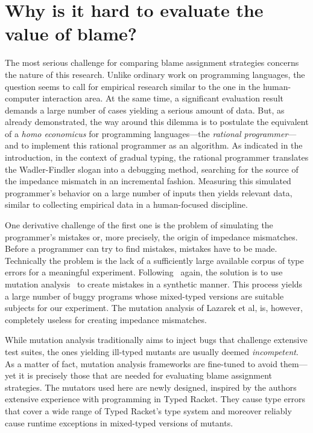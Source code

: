 
\section{Why is it hard to evaluate the value of blame?}
\label{sec:challenges}

The most serious challenge for comparing blame assignment strategies concerns 
the nature of this research. Unlike ordinary
work on programming languages, the question seems to call for empirical research
similar to the one in the human-computer interaction area. At the same time, a
significant evaluation result demands a large number of cases yielding a serious
amount of data. But, as~\citet{lksfd-popl-2020} already demonstrated, the way
around this dilemma is to postulate the equivalent of a {\it homo economicus\/}
for programming languages---the {\em rational programmer\/}---and to implement
this rational programmer as an algorithm.  As indicated in the introduction, in
the context of gradual typing, the rational programmer translates the
Wadler-Findler slogan into a debugging method, searching for the source of the
impedance mismatch in an incremental fashion. Measuring this simulated
programmer's behavior on a large number of inputs then yields relevant 
data, similar to collecting empirical data in a human-focused discipline. 

One derivative challenge of the first one is the problem of simulating the
programmer's mistakes or, more precisely, the origin of impedance
mismatches. Before a programmer can try to find mistakes, mistakes have to
be made. Technically the problem is the lack of a sufficiently large
available corpus of type errors for a meaningful experiment.
Following~\citet{lksfd-popl-2020} again, the solution is to use mutation
analysis~\cite{lipton1971fault, demillo1978hints, jia2011analysis} to
create mistakes in a synthetic manner. This process yields a large number
of buggy programs whose mixed-typed versions are suitable subjects for our
experiment.  The mutation analysis of Lazarek et al, is, however,
completely useless for creating impedance mismatches.

While mutation analysis traditionally aims to inject bugs that challenge
extensive test suites, the ones yielding ill-typed mutants are usually deemed
\emph{incompetent}. As a matter of fact, mutation analysis frameworks are
fine-tuned to avoid them---yet it is precisely those that are needed for
evaluating blame assignment strategies. The mutators used here are newly designed,
inspired by the authors extensive experience with programming in Typed Racket.
They cause type errors that cover a wide range of Typed Racket's type system and moreover
reliably cause runtime exceptions in mixed-typed versions of mutants.

